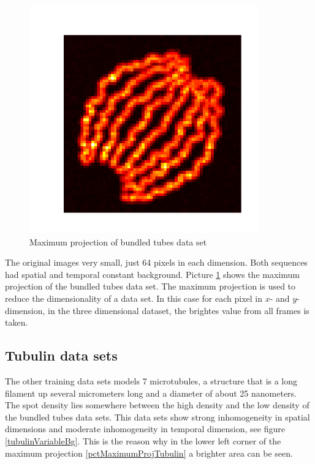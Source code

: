 \begin{figure}
\begin{minipage}[t]{0.33\textwidth}
\includegraphics[width = 0.88\textwidth]{pictures/maximumProjectionBundledTubesLSFarbig.png}
	\caption{Maximum projection of bundled tubes data set}
	\label{pctMaximumProjBundledTubes}

\end{minipage}
\end{figure}
The original images very small, just 64 pixels in each dimension. Both sequences had spatial and temporal constant background. Picture \ref{pctMaximumProjBundledTubes} shows the maximum projection of the bundled tubes data set. The maximum projection is used to reduce the dimensionality of a data set. In this case for each pixel in $x$- and $y$-dimension, in the three dimensional dataset, the brightes value from all frames is taken. 


\subsection{Tubulin data sets}
The other training data sets models 7 microtubules, a structure that is a long filament up several micrometers long and a diameter of about 25 nanometers. The spot density lies somewhere between the high density and the low density of the bundled tubes data sets. This data sets show strong inhomogeneity in spatial dimensions and moderate inhomogeneity in temporal dimension, see figure \ref{tubulinVariableBg}. This is the reason why in the lower left corner of the maximum projection \ref{pctMaximumProjTubulin} a brighter area can be seen.

